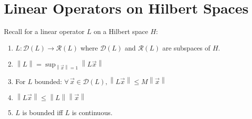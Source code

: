 \documentclass[letterpaper,12pt,fleqn]{article}
\newcommand{\md}{\mathcal{D}}
\newcommand{\mr}{\mathcal{R}}
\newcommand{\vx}{\vec{x}}
\newcommand{\norm}[1]{\left\|#1\right\|}
\begin{document}
\section*{Linear Operators on Hilbert Spaces}

Recall for a linear operator $L$ on a Hilbert space $H$:
\begin{enumerate}
\item $L:\md(L)\to\mr(L)$ where $\md(L)$ and $\mr(L)$ are subspaces of $H$.
\item $\norm{L}=\sup_{\norm{\vx}=1}\norm{L\vx}$
\item For $L$ bounded: $\forall\,\vx\in\md(L),\norm{L\vx}\le M\norm{\vx}$
\item $\norm{L\vx}\le\norm{L}\norm{\vx}$
\item $L$ is bounded iff $L$ is continuous.
\end{enumerate}
\end{document}
